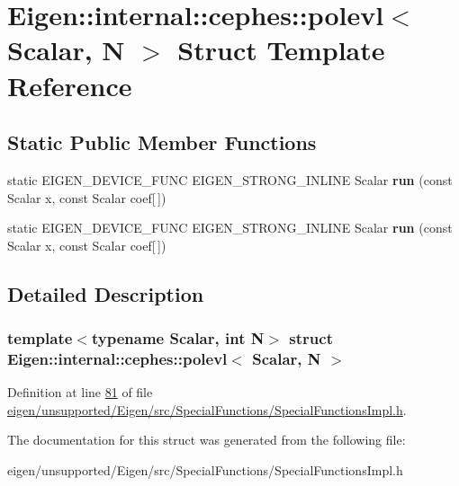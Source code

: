 \hypertarget{struct_eigen_1_1internal_1_1cephes_1_1polevl}{}\section{Eigen\+:\+:internal\+:\+:cephes\+:\+:polevl$<$ Scalar, N $>$ Struct Template Reference}
\label{struct_eigen_1_1internal_1_1cephes_1_1polevl}
\subsection*{Static Public Member Functions}
\begin{DoxyCompactItemize}
\item 
\mbox{\label{struct_eigen_1_1internal_1_1cephes_1_1polevl_a5a41c063bcf427993b13b1a31b39e3d6}} 
static E\+I\+G\+E\+N\+\_\+\+D\+E\+V\+I\+C\+E\+\_\+\+F\+U\+NC E\+I\+G\+E\+N\+\_\+\+S\+T\+R\+O\+N\+G\+\_\+\+I\+N\+L\+I\+NE Scalar {\bfseries run} (const Scalar x, const Scalar coef\mbox{[}$\,$\mbox{]})
\item 
\mbox{\label{struct_eigen_1_1internal_1_1cephes_1_1polevl_a5a41c063bcf427993b13b1a31b39e3d6}} 
static E\+I\+G\+E\+N\+\_\+\+D\+E\+V\+I\+C\+E\+\_\+\+F\+U\+NC E\+I\+G\+E\+N\+\_\+\+S\+T\+R\+O\+N\+G\+\_\+\+I\+N\+L\+I\+NE Scalar {\bfseries run} (const Scalar x, const Scalar coef\mbox{[}$\,$\mbox{]})
\end{DoxyCompactItemize}


\subsection{Detailed Description}
\subsubsection*{template$<$typename Scalar, int N$>$\newline
struct Eigen\+::internal\+::cephes\+::polevl$<$ Scalar, N $>$}



Definition at line \hyperlink{eigen_2unsupported_2_eigen_2src_2_special_functions_2_special_functions_impl_8h_source_l00081}{81} of file \hyperlink{eigen_2unsupported_2_eigen_2src_2_special_functions_2_special_functions_impl_8h_source}{eigen/unsupported/\+Eigen/src/\+Special\+Functions/\+Special\+Functions\+Impl.\+h}.



The documentation for this struct was generated from the following file\+:\begin{DoxyCompactItemize}
\item 
eigen/unsupported/\+Eigen/src/\+Special\+Functions/\+Special\+Functions\+Impl.\+h\end{DoxyCompactItemize}

